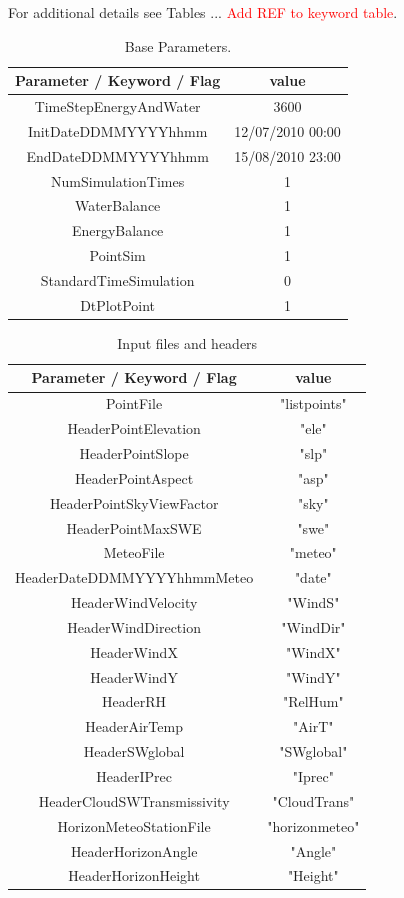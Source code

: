  For additional details see Tables ... \textcolor{red}{Add REF to keyword table}.
\begin{table}[h!]
\begin{center}
\begin{tabular}[c]{|c|c|}
\hline
Parameter / Keyword / Flag & value\\
\hline
TimeStepEnergyAndWater& 3600\\
InitDateDDMMYYYYhhmm  & 12/07/2010 00:00 \\
EndDateDDMMYYYYhhmm & 15/08/2010 23:00\\
NumSimulationTimes  & 1\\
WaterBalance & 1\\
EnergyBalance& 1\\
PointSim & 1\\
StandardTimeSimulation & 0 \\
DtPlotPoint & 1 \\
\hline
\end{tabular}
\caption{Base Parameters.}
\label{tab:baseParameters}
\end{center}
\end{table}
\begin{table}[h!]
\begin{center}
\begin{tabular}[c]{|c|c|}
\hline
Parameter / Keyword / Flag & value\\
\hline
PointFile& "listpoints" \\
HeaderPointElevation  & "ele" \\
HeaderPointSlope & "slp"\\
HeaderPointAspect  & "asp"\\
HeaderPointSkyViewFactor & "sky"\\
HeaderPointMaxSWE & "swe"\\
\hline
MeteoFile & "meteo"\\
HeaderDateDDMMYYYYhhmmMeteo & "date" \\
HeaderWindVelocity & "WindS" \\
HeaderWindDirection & "WindDir" \\
HeaderWindX & "WindX"\\
HeaderWindY &"WindY"  \\
HeaderRH & "RelHum"\\
HeaderAirTemp & "AirT" \\
HeaderSWglobal & "SWglobal"\\
HeaderIPrec & "Iprec" \\
HeaderCloudSWTransmissivity & "CloudTrans" \\
\hline
HorizonMeteoStationFile & "horizonmeteo"\\
HeaderHorizonAngle & "Angle" \\
HeaderHorizonHeight & "Height"\\
\hline
\end{tabular}
\caption{Input files and headers}
\label{tab:inputHeader}
\end{center}
\end{table}
